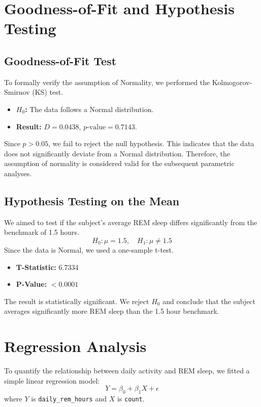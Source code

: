 \documentclass[conference]{IEEEtran}
\begin{document}
\section{Goodness-of-Fit and Hypothesis Testing}

\subsection{Goodness-of-Fit Test}
To formally verify the assumption of Normality, we performed the Kolmogorov-Smirnov (KS) test.
\begin{itemize}
    \item \textbf{$H_0$:} The data follows a Normal distribution.
    \item \textbf{Result:} $D = 0.0438$, $p\text{-value} = 0.7143$.
\end{itemize}
Since $p > 0.05$, we fail to reject the null hypothesis. This indicates that the data does not significantly deviate from a Normal distribution. Therefore, the assumption of normality is considered valid for the subsequent parametric analyses.

\subsection{Hypothesis Testing on the Mean}
We aimed to test if the subject's average REM sleep differs significantly from the benchmark of 1.5 hours.
\[ H_0: \mu = 1.5, \quad H_1: \mu \neq 1.5 \]
Since the data is Normal, we used a one-sample t-test.
\begin{itemize}
    \item \textbf{T-Statistic:} 6.7334
    \item \textbf{P-Value:} $< 0.0001$
\end{itemize}
The result is statistically significant. We reject $H_0$ and conclude that the subject averages significantly more REM sleep than the 1.5 hour benchmark.

\section{Regression Analysis}
To quantify the relationship between daily activity and REM sleep, we fitted a simple linear regression model:
\[ Y = \beta_0 + \beta_1 X + \epsilon \]
where $Y$ is \texttt{daily\_rem\_hours} and $X$ is \texttt{count}.
\end{document}
